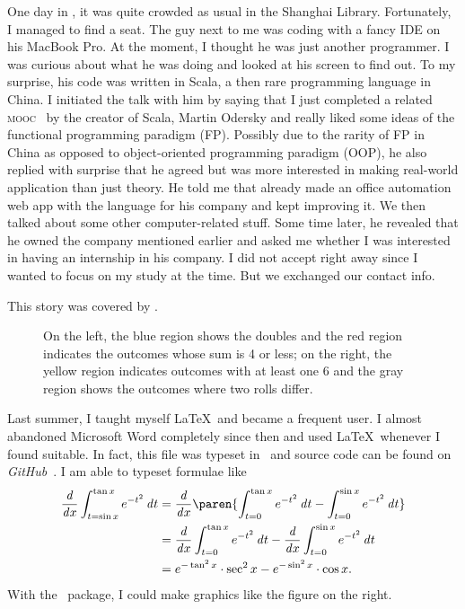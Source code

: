 	One day in , it was quite crowded as usual in the Shanghai Library.
	Fortunately, I managed to find a seat. The guy next to me was coding with a
	fancy IDE on his MacBook Pro. At the moment, I thought he was just another
	programmer. I was curious about what he was doing and looked at his screen to
	find out. To my surprise, his code was written in Scala, a then rare
	programming language in China. I initiated the talk with him by saying that I
	just completed a related \textsc{mooc}~\cite{FPPS} by the creator of Scala,
	Martin Odersky and really liked some ideas of the functional programming
	paradigm (FP). Possibly due to the rarity of FP in China as opposed to
	object-oriented programming paradigm (OOP), he also replied with surprise that
	he agreed but was more interested in making real-world application than just
	theory. He told me that already made an office automation web app with the
	language for his company and kept improving it. We then talked about some other
	computer-related stuff. Some time later, he revealed that he owned the company
	mentioned earlier and asked me whether I was interested in having an internship
	in his company. I did not accept right away since I wanted to focus on my study
	at the time. But we exchanged our contact info.
	
	This story was covered by .
	
	\begin{wrapfigure}[8]{r}[.6in]{.4\textwidth}
		\scalebox{.4}{  }
		\caption{On the left, the blue region shows the doubles and the red region
			indicates the outcomes whose sum is 4 or less; on the right, the yellow region
			indicates outcomes with at least one 6 and the gray region shows the outcomes
			where two rolls differ.}
		\label{fig:CondProbEx}
	\end{wrapfigure}
	
	Last summer, I taught myself \LaTeX\ and became a frequent user. I almost
	abandoned Microsoft Word completely since then and used \LaTeX\ whenever I found
	suitable. In fact, this file was typeset in \LuaLaTeX\ and source code can be
	found on \textit{GitHub}~\cite{Readmission}. I am able to typeset formulae like
	\begin{align*}
	\dd x \int_{t=\sin x}^{\tan x} e^{-t^2} \dt
		&= \dd x \paren{\int_{t=0}^{\tan x} e^{-t^2} \dt -
			\int_{t=0}^{\sin x} e^{-t^2} \dt} \\
		&= \dd x \int_{t=0}^{\tan x} e^{-t^2} \dt
			- \dd x \int_{t=0}^{\sin x} e^{-t^2} \dt \\
		&= e^{-\tan^2 x} \cdot \sec^2 x - e^{-\sin^2 x} \cdot \cos x.
	\end{align*}
	With the \TikZ\ package, I could make graphics like the figure on the right.
	
